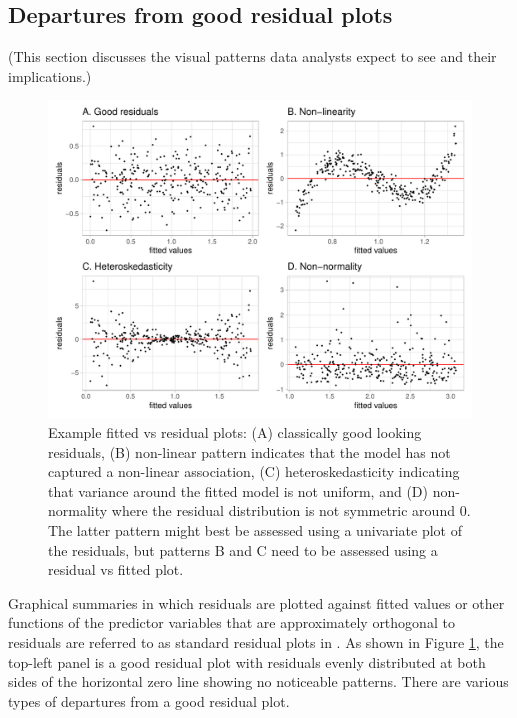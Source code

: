 \documentclass[]{interact}
\theoremstyle{plain}%
\theoremstyle{definition}
\theoremstyle{remark}
\begin{document}
\hypertarget{departures-from-good-residual-plots}{%
\subsection{Departures from good residual
plots}\label{departures-from-good-residual-plots}}

(This section discusses the visual patterns data analysts expect to see
and their implications.)

\begin{figure}
\includegraphics[width=1\linewidth]{paper_comparison_files/figure-latex/residual-plot-common-departures-1} \caption{Example fitted vs residual plots: (A) classically good looking residuals, (B) non-linear pattern indicates that the model has not captured a non-linear association, (C) heteroskedasticity indicating that variance around the fitted model is not uniform, and (D) non-normality where the residual distribution is not symmetric around 0. The latter pattern might best be assessed using a univariate plot of the residuals, but patterns B and C need to be assessed using a residual vs fitted plot.}\label{fig:residual-plot-common-departures}
\end{figure}

Graphical summaries in which residuals are plotted against fitted values
or other functions of the predictor variables that are approximately
orthogonal to residuals are referred to as standard residual plots in
\citet{cook1982residuals}. As shown in Figure
\ref{fig:residual-plot-common-departures}, the top-left panel is a good
residual plot with residuals evenly distributed at both sides of the
horizontal zero line showing no noticeable patterns. There are various
types of departures from a good residual plot.
\end{document}
